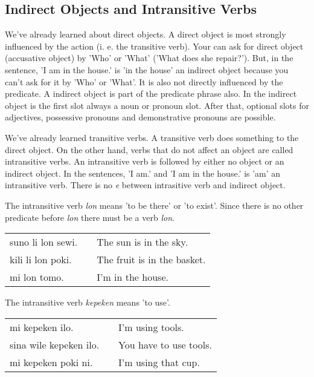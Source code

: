 \subsection*{Indirect Objects and Intransitive Verbs}
%
%
We've already learned about direct objects. 
A direct object is most strongly influenced by the action (i. e. the transitive verb). 
Your can ask for direct object (accusative object) by 'Who' or 'What' ('What does she repair?').
But, in the sentence, 'I am in the house.' is 'in the house' an indirect object because you can't ask for it by 'Who' or 'What'.
It is also not directly influenced by the predicate. 
A indirect object is part of the predicate phrase also. 
In the indirect object is the first slot always a noun or pronoun slot.
After that, optional slots for adjectives, possessive pronouns and demonstrative pronouns are possible. 

We've already learned transitive verbs. 
A transitive verb does something to the direct object. 
On the other hand, verbs that do not affect an object are called intransitive verbs. 
An intransitive verb is followed by either no object or an indirect object. 
In the sentences, 'I am.' and 'I am in the house.' is 'am' an intransitive verb. 
There is no \textit{e} between intrasitive verb and indirect object.

%
The intransitive verb \textit{lon} means 'to be there' or 'to exist'.
Since there is no other predicate before \textit{lon} there must be a verb \textit{lon}. 

\begin{supertabular}{p{5,5cm}|ll}
suno li lon sewi. && The sun is in the sky. \\
kili li lon poki. && The fruit is in the basket. \\
mi lon tomo. && I'm in the house. \\
\end{supertabular} 

%
The intransitive verb \textit{kepeken} means 'to use'.
 
\begin{supertabular}{p{5,5cm}|ll}
mi kepeken ilo. && I'm using tools. \\
sina wile kepeken ilo. && You have to use tools. \\
mi kepeken poki ni. && I'm using that cup. \\
\end{supertabular} 

